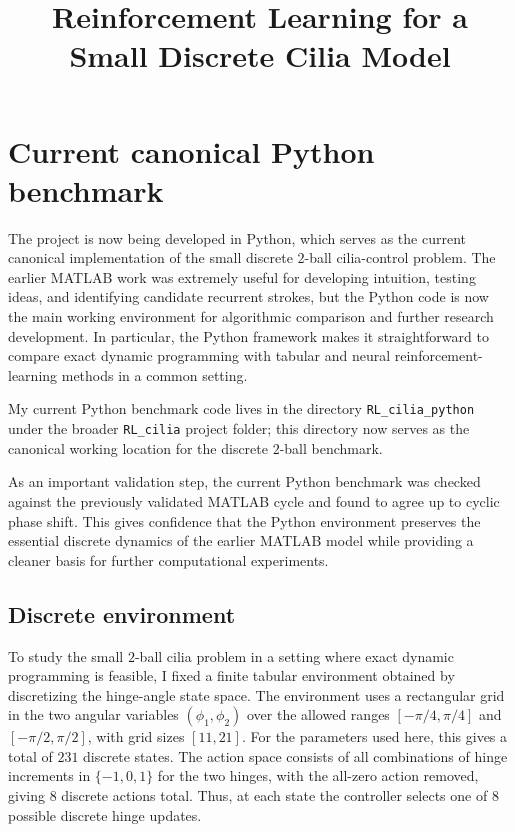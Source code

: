 \documentclass{article}
\title{Reinforcement Learning for a Small Discrete Cilia Model}
\begin{document}
\maketitle

\section{Current canonical Python benchmark}

The project is now being developed in Python, which serves as the current canonical implementation of the small discrete $2$-ball cilia-control problem. The earlier MATLAB work was extremely useful for developing intuition, testing ideas, and identifying candidate recurrent strokes, but the Python code is now the main working environment for algorithmic comparison and further research development. In particular, the Python framework makes it straightforward to compare exact dynamic programming with tabular and neural reinforcement-learning methods in a common setting.

My current Python benchmark code lives in the directory \texttt{RL\_cilia\_python} under the broader \texttt{RL\_cilia} project folder; this directory now serves as the canonical working location for the discrete $2$-ball benchmark.

As an important validation step, the current Python benchmark was checked against the previously validated MATLAB cycle and found to agree up to cyclic phase shift. This gives confidence that the Python environment preserves the essential discrete dynamics of the earlier MATLAB model while providing a cleaner basis for further computational experiments. 

\subsection{Discrete environment}

To study the small $2$-ball cilia problem in a setting where exact dynamic programming is feasible, I fixed a finite tabular environment obtained by discretizing the hinge-angle state space. The environment uses a rectangular grid in the two angular variables $(\phi_1,\phi_2)$ over the allowed ranges $[-\pi/4,\pi/4]$ and $[-\pi/2,\pi/2]$, with grid sizes $[11,21]$. For the parameters used here, this gives a total of $231$ discrete states. The action space consists of all combinations of hinge increments in $\{-1,0,1\}$ for the two hinges, with the all-zero action removed, giving $8$ discrete actions total. Thus, at each state the controller selects one of $8$ possible discrete hinge updates. 
\end{document}
